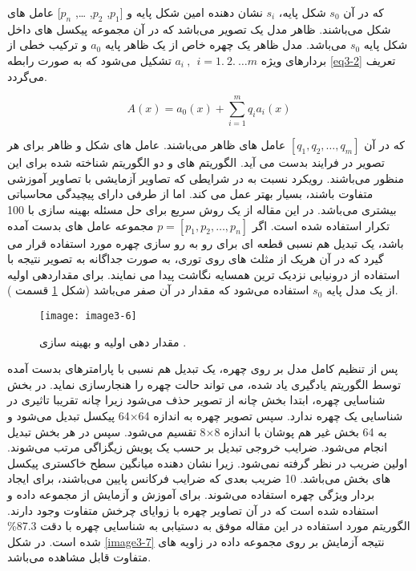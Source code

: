 \noindent
که در آن $s_0$ شکل پایه، $s_i$ نشان دهنده  امین شکل پایه و [$p_1$, $p_2$, \ldots, $p_n$] عامل های شکل می‌باشند. ظاهر  مدل  یک تصویر  می‌باشد که در آن  مجموعه پیکسل های داخل شکل پایه $s_0$ می‌باشد. مدل ظاهر یک چهره خاص از یک ظاهر پایه $a_0$ و ترکیب خطی از بردارهای ویژه
$a_i\ ,\ \ i=1.\ 2.\ \ldots m$
تشکیل می‌شود که به صورت رابطه \ref{eq3-2} تعریف می‌گردد.

\begin{equation}\label{eq3-2}
A(x)=a_0(x)+\sum_{i=1}^{m}{q_ia_i(x)}
\end{equation}

\noindent
که در آن $[q_1, q_2, \ldots , q_m]$ عامل های ظاهر می‌باشند. عامل های شکل و ظاهر برای هر تصویر در فرایند  بدست می آید. الگوریتم های  و   دو الگوریتم شناخته شده برای این منظور می‌باشند. رویکرد  نسبت به  در شرایطی که تصاویر آزمایشی با تصاویر آموزشی متفاوت باشند، بسیار بهتر عمل می کند. اما از طرفی دارای پیچیدگی محاسباتی بیشتری می‌باشد. در این مقاله از یک روش  سریع برای حل مسئله بهینه سازی با 100 تکرار استفاده شده است. اگر $p=[p_1, p_2, \ldots , p_n]$ مجموعه عامل های بدست آمده باشد، یک تبدیل هم نسبی قطعه ای   برای رو به رو سازی چهره مورد استفاده قرار می گیرد که در آن هریک از مثلث های روی توری، به صورت جداگانه به تصویر نتیجه با استفاده از درونیابی نزدیک ترین همسایه  نگاشت پیدا می نمایند. برای مقداردهی اولیه از یک مدل پایه $s_0$ استفاده می‌شود که مقدار  در آن صفر می‌باشد (شکل \ref{image3-6} قسمت ). 
 \begin{figure}[h]
\centering
  \texttt{[image: image3-6]}
  \caption{ مقدار دهی اولیه و بهینه سازی  \cite{HAGHIGHAT201623}.}
  \label{image3-6}
\end{figure}

\noindent
پس از تنظیم کامل مدل بر روی چهره، یک تبدیل هم نسبی با پارامترهای بدست آمده توسط الگوریتم یادگیری یاد شده، می تواند حالت چهره را هنجارسازی نماید. در بخش شناسایی چهره، ابتدا بخش چانه از تصویر حذف می‌شود زیرا چانه تقریبا تاثیری در شناسایی یک چهره ندارد. سپس تصویر چهره به اندازه 64×64 پیکسل تبدیل می‌شود و به 64 بخش غیر هم پوشان با اندازه 8×8 تقسیم می‌شود. سپس در هر بخش تبدیل   انجام می‌شود. ضرایب خروجی تبدیل  بر حسب یک پویش زیگزاگی مرتب می‌شوند. اولین ضریب در نظر گرفته نمی‌شود. زیرا نشان دهنده میانگین سطح خاکستری پیکسل های بخش می‌باشد. 10 ضریب بعدی که ضرایب فرکانس پایین می‌باشند، برای ایجاد بردار ویژگی چهره استفاده می‌شوند. برای آموزش و آزمایش از مجموعه داده  و  استفاده شده است که در آن تصاویر چهره با زوایای چرخش متفاوت وجود دارند. الگوریتم مورد استفاده در این مقاله موفق به دستیابی به شناسایی چهره با دقت 87.3\% شده است. در شکل \ref{image3-7} نتیجه آزمایش بر روی مجموعه داده   در زاویه های متفاوت قابل مشاهده می‌باشد.

